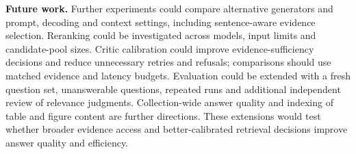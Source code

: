 \textbf{Future work.} Further experiments could compare alternative generators and prompt, decoding and context settings, including sentence-aware evidence selection. Reranking could be investigated across models, input limits and candidate-pool sizes. Critic calibration could improve evidence-sufficiency decisions and reduce unnecessary retries and refusals; comparisons should use matched evidence and latency budgets. Evaluation could be extended with a fresh question set, unanswerable questions, repeated runs and additional independent review of relevance judgments. Collection-wide answer quality and indexing of table and figure content are further directions. These extensions would test whether broader evidence access and better-calibrated retrieval decisions improve answer quality and efficiency.
